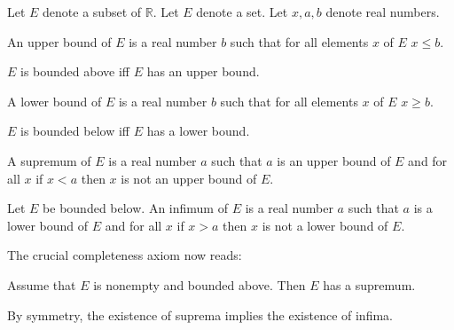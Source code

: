 \documentclass{article}
\begin{document}
\begin{forthel}

Let $E$ denote a subset of $\mathbb{R}$.
Let $E$ denote a set.
Let $x,a,b$ denote real numbers.

\begin{definition}
An upper bound of $E$ is a
real number $b$ such that for all elements $x$ of $E$ $x \leq b$.
\end{definition}

\begin{definition}
$E$ is bounded above iff
$E$ has an upper bound.
\end{definition}

\begin{definition}
A lower bound of $E$ is a
real number $b$ such that for all elements $x$ of $E$ $x \geq b$.
\end{definition}

\begin{definition}
$E$ is bounded below iff
$E$ has a lower bound.
\end{definition}

\begin{definition}
A supremum of $E$ is a real number $a$ such that
$a$ is an upper bound of $E$ and for all $x$ if $x < a$ then $x$
is not an upper bound of $E$.
\end{definition}

\begin{definition}
Let $E$ be bounded below.
An infimum of $E$ is a real number $a$ such that
$a$ is a lower bound of $E$ and for all $x$ if $x > a$ then $x$ is
not a lower bound of $E$.
\end{definition}
\end{forthel}
%
The crucial completeness axiom now reads:
%
\begin{forthel}
\begin{axiom}
Assume that $E$ is nonempty and bounded above.
Then $E$ has a supremum.
\end{axiom}
\end{forthel}
%
By symmetry, the existence of suprema implies the existence
of infima.
%
\end{document}
